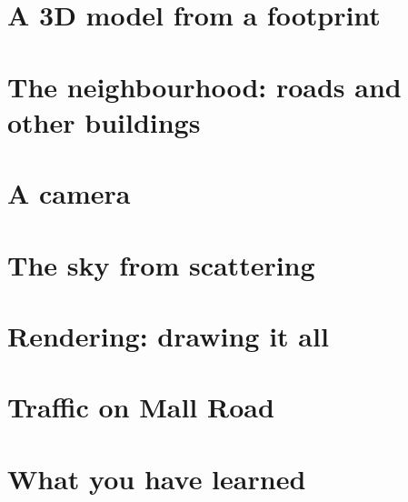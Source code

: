 \section{A 3D model from a footprint}

\section{The neighbourhood: roads and other buildings}

\section{A camera}

\section{The sky from scattering}

\section{Rendering: drawing it all}

\section{Traffic on Mall Road}

\section{What you have learned}

